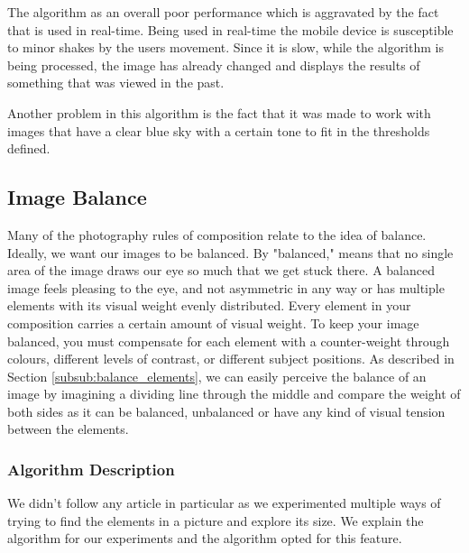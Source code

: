 The algorithm as an overall poor performance which is aggravated by the fact that is used in real-time. Being used in real-time the mobile device is susceptible to minor shakes by the users movement. Since it is slow, while the algorithm is being processed, the image has already changed and displays the results of something that was viewed in the past.

Another problem in this algorithm is the fact that it was made to work with images that have a clear blue sky with a certain tone to fit in the thresholds defined.

\subsection{Image Balance}
\label{sub:balance}
Many of the photography rules of composition relate to the idea of balance. Ideally, we want our images to be balanced. By "balanced," means that no single area of the image draws our eye so much that we get stuck there. A balanced image feels pleasing to the eye, and not asymmetric in any way or has multiple elements with its visual weight evenly distributed. Every element in your composition carries a certain amount of visual weight. To keep your image balanced, you must compensate for each element with a counter-weight through colours, different levels of contrast, or different subject positions. As described in Section \ref{subsub:balance_elements}, we can easily perceive the balance of an image by imagining a dividing line through the middle and compare the weight of both sides as it can be balanced, unbalanced or have any kind of visual tension between the elements.

\subsubsection{Algorithm Description}

We didn't follow any article in particular as we experimented multiple ways of trying to find the elements in a picture and explore its size. We explain the algorithm for our experiments and the algorithm opted for this feature.

